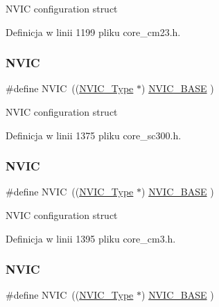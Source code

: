 N\+V\+IC configuration struct 

Definicja w linii 1199 pliku core\+\_\+cm23.\+h.

\mbox{\label{group___c_m_s_i_s__core__base_gac8e97e8ce56ae9f57da1363a937f8a17}} 
\subsubsection{\texorpdfstring{N\+V\+IC}{NVIC}\hspace{0.1cm}{\footnotesize\ttfamily [7/12]}}
{\footnotesize\ttfamily \#define N\+V\+IC~((\hyperlink{struct_n_v_i_c___type}{N\+V\+I\+C\+\_\+\+Type}      $\ast$)     \hyperlink{group___c_m_s_i_s__core__base_gaa0288691785a5f868238e0468b39523d}{N\+V\+I\+C\+\_\+\+B\+A\+SE}     )}

N\+V\+IC configuration struct 

Definicja w linii 1375 pliku core\+\_\+sc300.\+h.

\mbox{\label{group___c_m_s_i_s__core__base_gac8e97e8ce56ae9f57da1363a937f8a17}} 
\subsubsection{\texorpdfstring{N\+V\+IC}{NVIC}\hspace{0.1cm}{\footnotesize\ttfamily [8/12]}}
{\footnotesize\ttfamily \#define N\+V\+IC~((\hyperlink{struct_n_v_i_c___type}{N\+V\+I\+C\+\_\+\+Type}      $\ast$)     \hyperlink{group___c_m_s_i_s__core__base_gaa0288691785a5f868238e0468b39523d}{N\+V\+I\+C\+\_\+\+B\+A\+SE}     )}

N\+V\+IC configuration struct 

Definicja w linii 1395 pliku core\+\_\+cm3.\+h.

\mbox{\label{group___c_m_s_i_s__core__base_gac8e97e8ce56ae9f57da1363a937f8a17}} 
\subsubsection{\texorpdfstring{N\+V\+IC}{NVIC}\hspace{0.1cm}{\footnotesize\ttfamily [9/12]}}
{\footnotesize\ttfamily \#define N\+V\+IC~((\hyperlink{struct_n_v_i_c___type}{N\+V\+I\+C\+\_\+\+Type}      $\ast$)     \hyperlink{group___c_m_s_i_s__core__base_gaa0288691785a5f868238e0468b39523d}{N\+V\+I\+C\+\_\+\+B\+A\+SE}     )}

